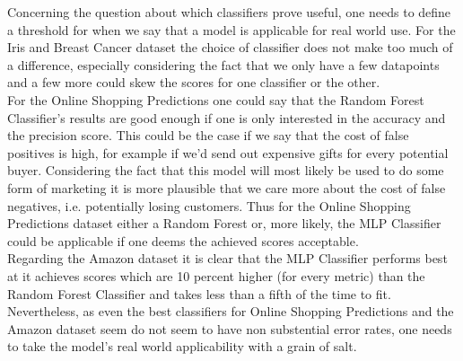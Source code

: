 \documentclass{article}
\begin{document}
Concerning the question about which classifiers prove useful, one needs to define a threshold for when we say that a model is applicable for real world use. For the Iris and Breast Cancer dataset the choice of classifier does not make too much of a difference, especially considering the fact that we only have a few datapoints and a few more could skew the scores for one classifier or the other. \\
For the Online Shopping Predictions one could say that the Random Forest Classifier's results are good enough if one is only interested in the accuracy and the precision score. This could be the case if we say that the cost of false positives is high, for example if we'd send out expensive gifts for every potential buyer. Considering the fact that this model will most likely be used to do some form of marketing it is more plausible that we care more about the cost of false negatives, i.e. potentially losing customers. Thus for the Online Shopping Predictions dataset either a Random Forest or, more likely, the MLP Classifier could be applicable if one deems the achieved scores acceptable. \\
Regarding the Amazon dataset it is clear that the MLP Classifier performs best at it achieves scores which are 10 percent higher (for every metric) than the Random Forest Classifier and takes less than a fifth of the time to fit. Nevertheless, as even the best classifiers for Online Shopping Predictions and the Amazon dataset seem do not seem to have non substential error rates, one needs to take the model's real world applicability with a grain of salt. \\
\newline
\end{document}
